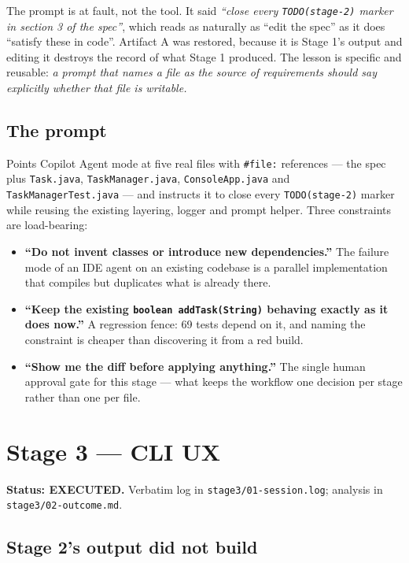 \documentclass[11pt,a4paper]{article}
\newcommand{\code}[1]{\texttt{\small #1}}
\newcommand{\ran}{\textcolor{good}{\textbf{EXECUTED}}}
\begin{document}
The prompt is at fault, not the tool. It said \emph{``close every
\code{TODO(stage-2)} marker in section 3 of the spec''}, which reads as
naturally as ``edit the spec'' as it does ``satisfy these in code''. Artifact A
was restored, because it is Stage 1's output and editing it destroys the record
of what Stage 1 produced. The lesson is specific and reusable: \emph{a prompt
that names a file as the source of requirements should say explicitly whether
that file is writable.}

\subsection{The prompt}

Points Copilot Agent mode at five real files with \code{\#file:} references ---
the spec plus \code{Task.java}, \code{TaskManager.java}, \code{ConsoleApp.java}
and \code{TaskManagerTest.java} --- and instructs it to close every
\code{TODO(stage-2)} marker while reusing the existing layering, logger and
prompt helper. Three constraints are load-bearing:

\begin{itemize}
  \item \textbf{``Do not invent classes or introduce new dependencies.''} The
        failure mode of an IDE agent on an existing codebase is a parallel
        implementation that compiles but duplicates what is already there.
  \item \textbf{``Keep the existing \code{boolean addTask(String)} behaving
        exactly as it does now.''} A regression fence: 69 tests depend on it,
        and naming the constraint is cheaper than discovering it from a red
        build.
  \item \textbf{``Show me the diff before applying anything.''} The single
        human approval gate for this stage --- what keeps the workflow
        one decision per stage rather than one per file.
\end{itemize}

\section{Stage 3 --- CLI UX}

\textbf{Status: \ran.} Verbatim log in \code{stage3/01-session.log}; analysis in
\code{stage3/02-outcome.md}.

\subsection{Stage 2's output did not build}
\end{document}
